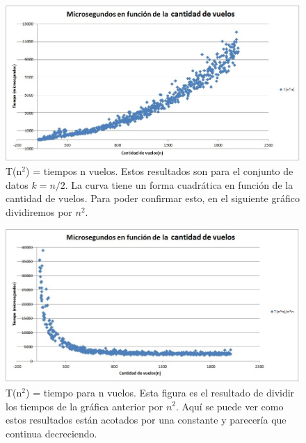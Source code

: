 \begin{figure}[H]
  \centering
  \includegraphics[scale=0.75]{Imagenes/Ej1/nSobre2}
  \caption{T(n$^{2}$) = tiempos  n vuelos. Estos resultados son para el conjunto de datos $k = n/2$.
      La curva tiene un forma cuadrática en función de la cantidad de vuelos. Para poder confirmar esto, en el siguiente gráfico dividiremos
    por $n^2$.
  }
  \label{}
\end{figure}

\begin{figure}[H]
  \centering
  \includegraphics[scale=0.75]{Imagenes/Ej1/nSobre2Const}
  \caption{T(n$^{2}$) = tiempo para n vuelos. Esta figura es el resultado de dividir los tiempos de la gráfica anterior por $n^2$.
    Aquí se puede ver como estos resultados están acotados por una constante y parecería que continua decreciendo.  }
  \label{}
\end{figure}

